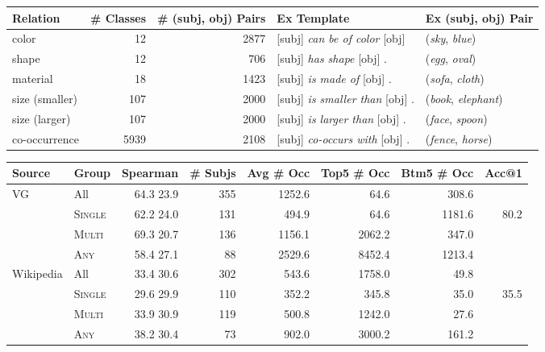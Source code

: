 \documentclass[11pt]{article}
\newcommand{\Single}{{\scshape Single}}
\newcommand{\Multi}{{\scshape Multi}}
\newcommand{\Any}{{\scshape Any}}
\newcommand{\dataset}{ViComTe}
\begin{document}
\begin{table*}
\small
\centering
\begin{tabular}{lrrll}
\hline
\textbf{Relation} & \textbf{\# Classes} & \textbf{\# (subj, obj) Pairs} & \textbf{Ex Template} & \textbf{Ex (subj, obj) Pair} \\
\hline
color & 12 & 2877 & [subj] {\it can be of color} [obj] & ({\it sky}, {\it blue}) \\
shape & 12 & 706 & [subj] {\it has shape} [obj] . & ({\it egg}, {\it oval}) \\
material & 18 & 1423 & [subj] {\it is made of} [obj] . & ({\it sofa}, {\it cloth}) \\
size (smaller) & 107 & 2000 & [subj] {\it is smaller than} [obj] . & ({\it book}, {\it elephant}) \\
size (larger) & 107 & 2000 & [subj] {\it is larger than} [obj] . & ({\it face}, {\it spoon}) \\
co-occurrence & 5939 & 2108 & [subj] {\it co-occurs with} [obj] . & ({\it fence}, {\it horse}) \\
\hline
\end{tabular}
\caption{\label{data-summary}
Summary of the {\dataset} dataset and the manual templates, including the number of classes, (subject, object) pairs, and an example pair for each relation.}

\hspace{1.4cm}

\begin{tabular}{llrrrrrr}
\hline 
\textbf{Source} & \textbf{Group} & \textbf{Spearman } & \textbf{\# Subjs} & \textbf{Avg \# Occ} & \textbf{Top5 \# Occ} & \textbf{Btm5 \# Occ} & \textbf{Acc@1} \\ 
\hline
VG & All & 64.3  23.9 & 355 & 1252.6 & 64.6 & 308.6\\
 & \Single{} & 62.2  24.0 & 131 & 494.9 & 64.6 & 1181.6 & 80.2\\
 & \Multi{} & 69.3  20.7 & 136 & 1156.1 & 2062.2 & 347.0\\
 & \Any{} & 58.4  27.1 & 88 & 2529.6 & 8452.4 & 1213.4\\
\hline
Wikipedia & All & 33.4  30.6 & 302 & 543.6 & 1758.0 & 49.8\\
 & \Single{} & 29.6  29.9 & 110 & 352.2 & 345.8 & 35.0 & 35.5\\
 & \Multi{} & 33.9  30.9 & 119 & 500.8 & 1242.0 & 27.6\\
 & \Any{} & 38.2  30.4 & 73 & 902.0 & 3000.2 & 161.2\\
\hline
\end{tabular}
\caption{\label{data-eval} Evaluation of {\dataset} (mined from VG) and Wikipedia-mined color datasets by comparing with the human-annotated dataset CoDa. Reported are the average Spearman correlation (), number of common subjects, average number of occurrences of the common subjects, average number of occurrences of subjects with top- and bottom-5 Spearman correlations, and the percentage of top-1 attributes being matched for the single group. {\dataset} has higher correlations with human annotations.}
\end{table*}
\end{document}
